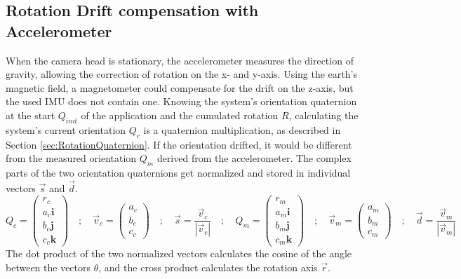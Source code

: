 \subsection{Rotation Drift compensation with Accelerometer}
\label{sec:RotDriftCompensation}
When the camera head is stationary, the accelerometer measures the direction of gravity, allowing the correction of rotation on the x- and y-axis.  Using the earth's magnetic field, a magnetometer could compensate for the drift on the z-axis, but the used IMU does not contain one.
Knowing the system's orientation quaternion at the start $Q_{init}$ of the application and the cumulated rotation $R$, calculating the system's current orientation $Q_{c}$ is a quaternion multiplication, as described in Section \ref{sec:RotationQuaternion}. If the orientation drifted, it would be different from the measured orientation $Q_{m}$ derived from the accelerometer. The complex parts of the two orientation quaternions get normalized and stored in individual vectors $\vec{s}$ and $\vec{d}$. 
\begin{equation*}
    Q_{c} =
    \begin{pmatrix}
        r_{c}           \\
        a_{c}\textbf{i} \\
        b_{c}\textbf{j} \\
        c_{c}\textbf{k}
    \end{pmatrix} \quad ; \quad
    \vec{v}_{c} =
    \begin{pmatrix}
        a_{c} \\
        b_{c} \\
        c_{c}
    \end{pmatrix} 
    \quad ; \quad
    \vec{s} = \frac{\vec{v}_{c}}{|\vec{v}_{c}|} 
    \quad ; \quad
    Q_{m} =
    \begin{pmatrix}
        r_{m}           \\
        a_{m}\textbf{i} \\
        b_{m}\textbf{j} \\
        c_{m}\textbf{k}
    \end{pmatrix} \quad ; \quad
    \vec{v}_{m} =
    \begin{pmatrix}
        a_{m} \\
        b_{m} \\
        c_{m}
    \end{pmatrix} 
    \quad ; \quad
    \vec{d} = \frac{\vec{v}_{m}}{|\vec{v}_{m}|}          
\end{equation*}
The dot product of the two normalized vectors calculates the cosine of the angle between the vectors $\theta$, and the cross product calculates the rotation axis $\vec{r}$. 
